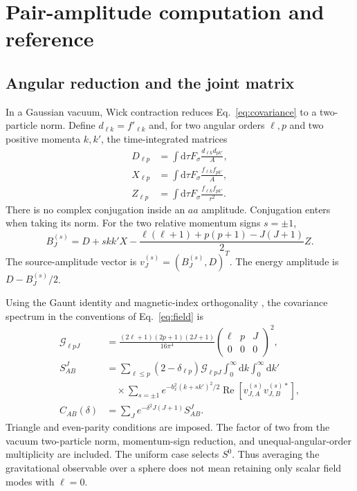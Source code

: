 \documentclass[aps,prd,reprint,floatfix,nofootinbib,longbibliography]{revtex4-2}
\newcommand{\dd}{\mathrm{d}}
\begin{document}
\section{Pair-amplitude computation and reference}
\subsection{Angular reduction and the joint matrix}
In a Gaussian vacuum, Wick contraction reduces Eq.~\eqref{eq:covariance} to a two-particle norm. Define $d_{\ell k}=f'_{\ell k}$ and, for two angular orders $\ell,p$ and two positive momenta $k,k'$, the time-integrated matrices
\begin{align}
 D_{\ell p}&=\int\dd\tau F_\sigma\frac{d_{\ell k}d_{pk'}}{A},\nonumber\\
 X_{\ell p}&=\int\dd\tau F_\sigma\frac{f_{\ell k}f_{pk'}}{A},\nonumber\\
 Z_{\ell p}&=\int\dd\tau F_\sigma\frac{f_{\ell k}f_{pk'}}{r^2}.
 \label{eq:matrices}
\end{align}
There is no complex conjugation inside an $aa$ amplitude. Conjugation enters when taking its norm. For the two relative momentum signs $s=\pm1$,
\begin{equation}
 B_J^{(s)}=D+s kk'X-\frac{\ell(\ell+1)+p(p+1)-J(J+1)}{2}Z.
 \label{eq:B}
\end{equation}
The source-amplitude vector is $v_J^{(s)}=(B_J^{(s)},D)^T$. The energy amplitude is $D-B_J^{(s)}/2$.

Using the Gaunt identity and magnetic-index orthogonality \cite{DLMF}, the covariance spectrum in the conventions of Eq.~\eqref{eq:field} is
\begin{align}
 \mathcal G_{\ell pJ}&=\frac{(2\ell+1)(2p+1)(2J+1)}{16\pi^4}
 \begin{pmatrix}\ell&p&J\\0&0&0\end{pmatrix}^{\!2},\nonumber\\
 S_{AB}^{J}&=\sum_{\ell\leq p}(2-\delta_{\ell p})\mathcal G_{\ell pJ}
 \int_0^{\infty}\dd k\int_0^{\infty}\dd k'\nonumber\\
 &\quad\times\sum_{s=\pm1}e^{-b_x^2(k+s k')^2/2}
 \operatorname{Re}[v_{J,A}^{(s)}v_{J,B}^{(s)*}],\label{eq:spectrum}\\
 C_{AB}(\delta)&=\sum_J e^{-\delta^2J(J+1)}S_{AB}^{J}.
 \label{eq:angularcov}
\end{align}
Triangle and even-parity conditions are imposed. The factor of two from the vacuum two-particle norm, momentum-sign reduction, and unequal-angular-order multiplicity are included. The uniform case selects $S^0$. Thus averaging the gravitational observable over a sphere does not mean retaining only scalar field modes with $\ell=0$.
\end{document}
